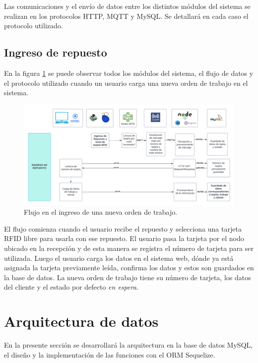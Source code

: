 Las comunicaciones y el envío de datos entre los distintos módulos del sistema se realizan en los protocolos HTTP, MQTT y MySQL. Se detallará en cada caso el protocolo utilizado.

\subsection{Ingreso de repuesto}
\label{subsec:ingresorepuesto}
En la figura \ref{fig:flujoingreso} se puede observar todos los módulos del sistema, el flujo de datos y el protocolo utilizado cuando un usuario carga una nueva orden de trabajo en el sistema.

\begin{figure}[ht]
	\centering
	\includegraphics[scale=.20]{./Figures/flujoingreso.png}
	\caption{Flujo en el ingreso de una nueva orden de trabajo.}
	\label{fig:flujoingreso}
\end{figure}
  
El flujo comienza cuando el usuario recibe el repuesto y selecciona una tarjeta RFID libre para usarla con ese repuesto. El usuario pasa la tarjeta por el nodo ubicado en la recepción y de esta manera se registra el número de tarjeta para ser utilizada. Luego el usuario carga los datos en el sistema web, dónde ya está asignada la tarjeta previamente leída, confirma los datos y estos son guardados en la base de datos. La nueva orden de trabajo tiene su número de tarjeta, los datos del cliente y el estado por defecto \textit{en espera}.

\section{Arquitectura de datos}
\label{sec:arquitecturadatos}
En la presente sección se desarrollará la arquitectura en la base de datos MySQL, el diseño y la implementación de las funciones con el ORM Sequelize.

